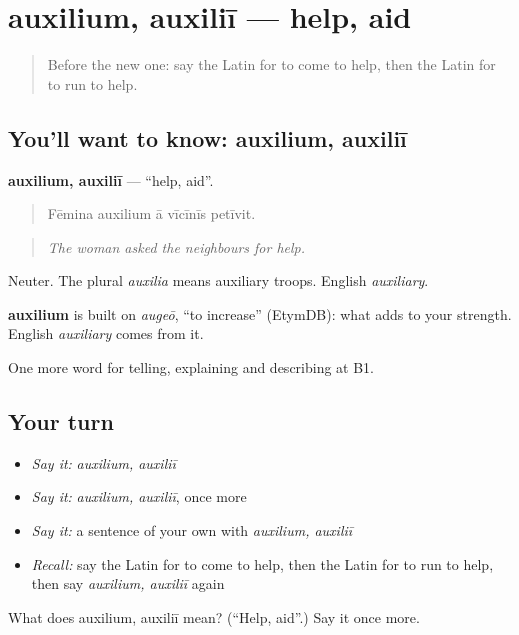 \section[auxilium, auxiliī]{auxilium, auxiliī — help, aid}

\label{lesson:LA-C316-auxilium}



\begin{quote}
Before the new one: say the Latin for to come to help, then the Latin for to run to help.
\end{quote}

\subsection*{You'll want to know: auxilium, auxiliī}
\textbf{auxilium, auxiliī} — \textquotedblleft{}help, aid\textquotedblright{}.

\begin{quote}
Fēmina auxilium ā vīcīnīs petīvit.
\end{quote}

\begin{quote}
\emph{The woman asked the neighbours for help.}
\end{quote}

Neuter. The plural \emph{auxilia} means auxiliary troops. English \emph{auxiliary}.

\begin{cousinweb}
\textbf{auxilium} is built on \emph{augeō}, \textquotedblleft{}to increase\textquotedblright{} (EtymDB): what adds to your strength. English \emph{auxiliary} comes from it.
\end{cousinweb}

\begin{grammarlens}[title={What you've built}]
One more word for telling, explaining and describing at B1.
\end{grammarlens}

\subsection*{Your turn}
\begin{itemize}
\raggedright
  \item \emph{Say it:} \emph{auxilium, auxiliī}
  \item \emph{Say it:} \emph{auxilium, auxiliī}, once more
  \item \emph{Say it:} a sentence of your own with \emph{auxilium, auxiliī}
  \item \emph{Recall:} say the Latin for to come to help, then the Latin for to run to help, then say \emph{auxilium, auxiliī} again
\end{itemize}

\begin{tcolorbox}[breakable,colback=teal!4,colframe=teal!35!black,title={Before you move on}]
What does auxilium, auxiliī mean? (\textquotedblleft{}Help, aid\textquotedblright{}.) Say it once more.
\end{tcolorbox}
